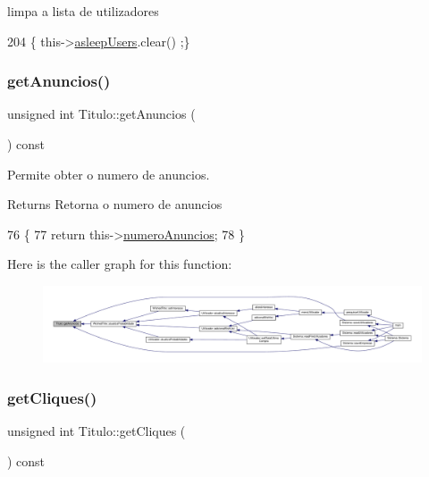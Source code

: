 limpa a lista de utilizadores 


\begin{DoxyCode}
204 \{ this->\hyperlink{classTitulo_a84e7b9dc58fbba5f048a57a0878a43e8}{asleepUsers}.clear() ;\}
\end{DoxyCode}
\mbox{\label{classTitulo_ad36afe75694812eabe74af5fe32ad95b}} 
\subsubsection{\texorpdfstring{get\+Anuncios()}{getAnuncios()}}
{\footnotesize\ttfamily unsigned int Titulo\+::get\+Anuncios (\begin{DoxyParamCaption}{ }\end{DoxyParamCaption}) const}



Permite obter o numero de anuncios. 

\begin{DoxyReturn}{Returns}
Retorna o numero de anuncios 
\end{DoxyReturn}

\begin{DoxyCode}
76                                         \{
77      \textcolor{keywordflow}{return} this->\hyperlink{classTitulo_a31919af9268f0c6e55b786457d1df586}{numeroAnuncios};
78  \}
\end{DoxyCode}
Here is the caller graph for this function\+:
\nopagebreak
\begin{figure}[H]
\begin{center}
\leavevmode
\includegraphics[width=350pt]{classTitulo_ad36afe75694812eabe74af5fe32ad95b_icgraph}
\end{center}
\end{figure}
\mbox{\label{classTitulo_a71d5b5985170de5612ec49c5c955f120}} 
\subsubsection{\texorpdfstring{get\+Cliques()}{getCliques()}}
{\footnotesize\ttfamily unsigned int Titulo\+::get\+Cliques (\begin{DoxyParamCaption}{ }\end{DoxyParamCaption}) const}



